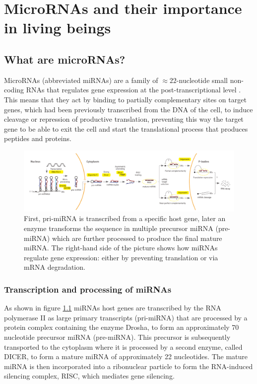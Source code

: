 
\chapter{MicroRNAs and their importance in living beings} %

\label{Chapter2} %


\section{What are microRNAs?}
MicroRNAs (abbreviated miRNAs) are a family of $\approx 22$-nucleotide small non-coding RNAs that regulates gene expression at the post-transcriptional level \cite{mirna_intro}. This means that they act by binding to partially complementary sites on target genes, which had been previously transcribed from the DNA of the cell, to induce cleavage or repression of productive translation, preventing this way the target gene to be able to exit the cell and start the translational process that produces peptides and proteins.

\begin{figure}[hbt!]
	\centering
	\includegraphics[width=1.0\textwidth]{Figures/mirna_genesis}
	\caption{ First, pri-miRNA is transcribed from a specific host gene, later an enzyme transforms the sequence in multiple precursor miRNA (pre-miRNA) which are further processed to produce the final mature miRNA. The right-hand side of the picture shows how miRNAs regulate gene expression: either by preventing translation or via mRNA degradation.}
	\label{fig:mirna_genesis}
\end{figure}

\subsection{Transcription and processing of miRNAs}
As shown in figure \ref{fig:mirna_genesis} miRNAs host genes are transcribed by the RNA polymerase II as large primary transcripts (pri-miRNA) that are processed by a protein complex containing the enzyme Drosha, to form an approximately 70 nucleotide precursor miRNA (pre-miRNA). This precursor is subsequently transported to the cytoplasm where it is processed by a second enzyme, called DICER, to form a mature miRNA of approximately 22 nucleotides. The mature miRNA is then incorporated into a ribonuclear particle to form the RNA-induced silencing complex, RISC, which mediates gene silencing.

